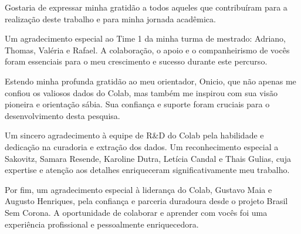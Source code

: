 Gostaria de expressar minha gratidão a todos aqueles que contribuíram para a realização deste trabalho e para minha jornada acadêmica.

Um agradecimento especial ao Time 1 da minha turma de mestrado: Adriano, Thomas, Valéria e Rafael. A colaboração, o apoio e o companheirismo de vocês foram essenciais para o meu crescimento e sucesso durante este percurso.

Estendo minha profunda gratidão ao meu orientador, Onicio, que não apenas me confiou os valiosos dados do Colab, mas também me inspirou com sua visão pioneira e orientação sábia. Sua confiança e suporte foram cruciais para o desenvolvimento desta pesquisa.

Um sincero agradecimento à equipe de R\&D do Colab pela habilidade e dedicação na curadoria e extração dos dados. Um reconhecimento especial a Sakovitz, Samara Resende, Karoline Dutra, Letícia Candal e Thais Gulias, cuja expertise e atenção aos detalhes enriqueceram significativamente meu trabalho.

Por fim, um agradecimento especial à liderança do Colab, Gustavo Maia e Augusto Henriques, pela confiança e parceria duradoura desde o projeto Brasil Sem Corona. A oportunidade de colaborar e aprender com vocês foi uma experiência profissional e pessoalmente enriquecedora.